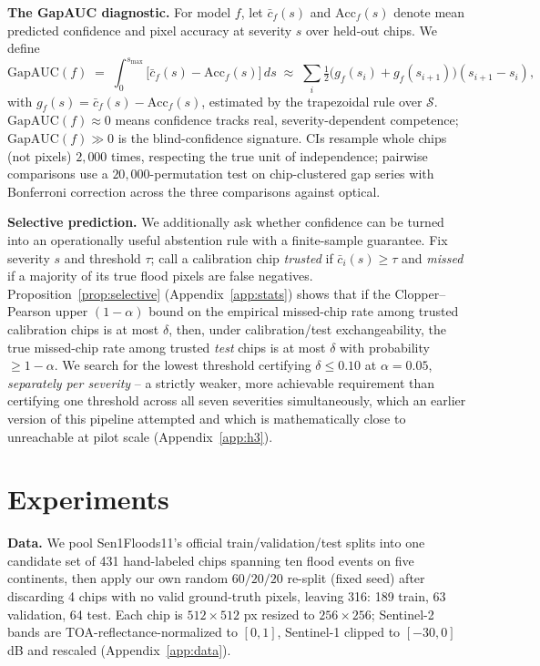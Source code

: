 \documentclass{article}
\begin{document}
\textbf{The GapAUC diagnostic.} For model $f$, let $\bar c_f(s)$ and $\mathrm{Acc}_f(s)$ denote mean predicted confidence and pixel accuracy at severity $s$ over held-out chips. We define
\begin{equation}
\label{eq:gapauc}
\mathrm{GapAUC}(f) \;=\; \int_0^{s_{\max}} \big[\bar c_f(s) - \mathrm{Acc}_f(s)\big]\, ds \;\approx\; \sum_{i} \tfrac{1}{2}\big(g_f(s_i) + g_f(s_{i+1})\big)(s_{i+1}-s_i),
\end{equation}
with $g_f(s) = \bar c_f(s) - \mathrm{Acc}_f(s)$, estimated by the trapezoidal rule over $\mathcal S$. $\mathrm{GapAUC}(f) \approx 0$ means confidence tracks real, severity-dependent competence; $\mathrm{GapAUC}(f) \gg 0$ is the blind-confidence signature. CIs resample whole chips (not pixels) $2{,}000$ times, respecting the true unit of independence; pairwise comparisons use a $20{,}000$-permutation test on chip-clustered gap series with Bonferroni correction across the three comparisons against optical.

\textbf{Selective prediction.} We additionally ask whether confidence can be turned into an operationally useful abstention rule with a finite-sample guarantee. Fix severity $s$ and threshold $\tau$; call a calibration chip \emph{trusted} if $\bar c_i(s)\ge\tau$ and \emph{missed} if a majority of its true flood pixels are false negatives. Proposition~\ref{prop:selective} (Appendix~\ref{app:stats}) shows that if the Clopper--Pearson upper $(1-\alpha)$ bound \citep{clopper1934use} on the empirical missed-chip rate among trusted calibration chips is at most $\delta$, then, under calibration/test exchangeability, the true missed-chip rate among trusted \emph{test} chips is at most $\delta$ with probability $\ge 1-\alpha$. We search for the lowest threshold certifying $\delta\le0.10$ at $\alpha=0.05$, \emph{separately per severity} -- a strictly weaker, more achievable requirement than certifying one threshold across all seven severities simultaneously, which an earlier version of this pipeline attempted and which is mathematically close to unreachable at pilot scale (Appendix~\ref{app:h3}).

\section{Experiments}
\label{sec:experiments}

\textbf{Data.} We pool Sen1Floods11's official train/validation/test splits into one candidate set of 431 hand-labeled chips spanning ten flood events on five continents, then apply our own random $60/20/20$ re-split (fixed seed) after discarding 4 chips with no valid ground-truth pixels, leaving 316: 189 train, 63 validation, 64 test. Each chip is $512\times512$ px resized to $256\times256$; Sentinel-2 bands are TOA-reflectance-normalized to $[0,1]$, Sentinel-1 clipped to $[-30,0]$ dB and rescaled (Appendix~\ref{app:data}).
\end{document}
